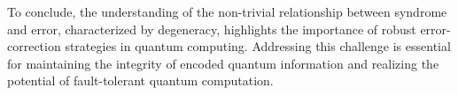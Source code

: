 \documentclass[12pt]{report}
\begin{document}
\begin{minipage}{1 \textwidth}
		To conclude, the understanding of the non-trivial relationship between syndrome and error, characterized by degeneracy, highlights the importance of robust error-correction strategies in quantum computing. Addressing this challenge is essential for maintaining the integrity of encoded quantum information and realizing the potential of fault-tolerant quantum computation. \newline
		
		
	\end{minipage}
	
	\begin{minipage}{1 \textwidth}
		
	\end{minipage}
	
	
	
	
	\begin{minipage}{1 \textwidth}
		
	\end{minipage}
	
	\begin{minipage}{1 \textwidth}
		
	\end{minipage}
	
	\begin{minipage}{1 \textwidth}
		
	\end{minipage}
	
	

 
	
\end{document}
